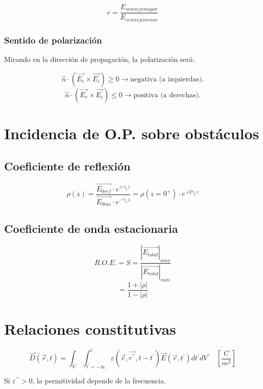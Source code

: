 \documentclass[12pt,a4paper]{article}
\begin{document}
\[ r = \frac{E_{semieje mayor}}{E_{semieje menor}} \] 

\subsubsection{Sentido de polarización}
\label{ssub:sentido_de_polarizacion}

Mirando en la dirección de propagación, la polarización será:

\[ \hat{n} \cdot \left( \vec{E_r} \times \vec{E_i} \right) \geq 0
\rightarrow \mbox{negativa (a izquierdas)}. \]
\[ \hat{n} \cdot \left( \vec{E_r} \times \vec{E_i} \right) \leq 0
\rightarrow \mbox{positiva (a derechas)}. \]

\section{Incidencia de O.P. sobre obstáculos}
\label{sec:incidencia_de_o_p_sobre_obstaculos}

\subsection{Coeficiente de reflexión}
\label{sub:coeficiente_de_reflexion}

\[ \rho (z) = \frac{\vec{E_{0 ref}} \cdot e^{+\gamma_1 z}}{\vec{E_{0 inc}}
\cdot e^{-\gamma_1 z}} = \rho (z=0^+) \cdot e^{+2\gamma_1 z} \]

\subsection{Coeficiente de onda estacionaria}
\label{sub:coeficiente_de_onda_estacionaria}

\[ R.O.E. = S = \frac{\left| \vec{E_{total}} \right|_{max}}{\left|
\vec{E_{total}} \right|_{min}} \]
\[ = \frac{1+|\rho|}{1-|\rho|}  \]

\section{Relaciones constitutivas}
\label{sec:relaciones_constitutivas}

\[ \vec{D} (\vec{r}, t) = \int_{V^{\prime}} \int_{t^{\prime}=-\infty}^{t}
\varepsilon (\vec{r}, \vec{r^{\prime\prime}}, t-t^{\prime})
\vec{E} (\vec{r}, t^{\prime}) dt^{\prime} dV^{\prime}
\quad \left[\frac{C}{m^2} \right] \]

Si $ \varepsilon^{\prime\prime} > 0 $, la permitividad depende de la
frecuencia.
\end{document}
